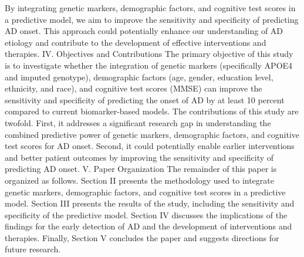 \documentclass[conference]{IEEEtran}
\begin{document}
By integrating genetic markers, demographic factors, and cognitive test scores in a predictive model, we aim to improve the sensitivity and specificity of predicting AD onset. This approach could potentially enhance our understanding of AD etiology and contribute to the development of effective interventions and therapies. IV. Objectives and Contributions The primary objective of this study is to investigate whether the integration of genetic markers (specifically APOE4 and imputed genotype), demographic factors (age, gender, education level, ethnicity, and race), and cognitive test scores (MMSE) can improve the sensitivity and specificity of predicting the onset of AD by at least 10 percent compared to current biomarker-based models. The contributions of this study are twofold. First, it addresses a significant research gap in understanding the combined predictive power of genetic markers, demographic factors, and cognitive test scores for AD onset. Second, it could potentially enable earlier interventions and better patient outcomes by improving the sensitivity and specificity of predicting AD onset. V. Paper Organization The remainder of this paper is organized as follows. Section II presents the methodology used to integrate genetic markers, demographic factors, and cognitive test scores in a predictive model. Section III presents the results of the study, including the sensitivity and specificity of the predictive model. Section IV discusses the implications of the findings for the early detection of AD and the development of interventions and therapies. Finally, Section V concludes the paper and suggests directions for future research.
\end{document}
